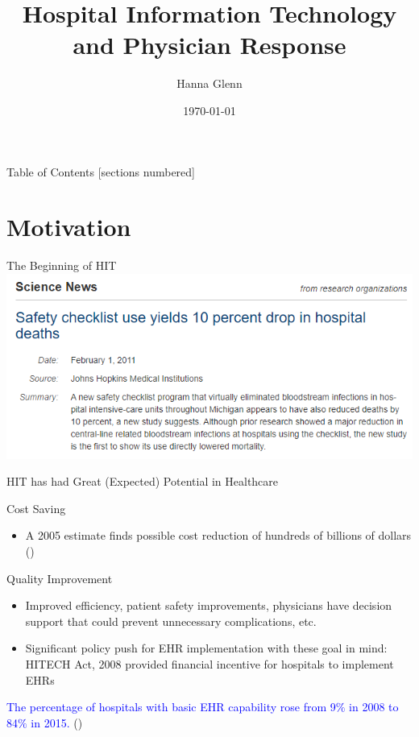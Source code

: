 \documentclass[10pt]{beamer}
\title{Hospital Information Technology and Physician Response}
\subtitle{Hanna Glenn}
\date{\today}
\begin{document}
\maketitle


\begin{frame}{Table of Contents}
  [sections numbered]
  \tableofcontents%
\end{frame}

\section[Motivation]{Motivation}

\begin{frame}{The Beginning of HIT}
\centering
    \includegraphics[scale=.6]{graphics/News Clip4.PNG}
\end{frame}

\begin{frame}[fragile]{HIT has had Great (Expected) Potential in Healthcare}
\begin{alertblock}{Cost Saving}
\begin{itemize}
    \item A 2005 estimate finds possible cost reduction of hundreds of billions of dollars (\cite{hillestad2005})
\end{itemize}
\end{alertblock}

\begin{alertblock}{Quality Improvement}
\begin{itemize}
    \item Improved efficiency, patient safety improvements, physicians have decision support that could prevent unnecessary complications, etc.
    \item Significant policy push for EHR implementation with these goal in mind: HITECH Act, 2008 provided financial incentive for hospitals to implement EHRs \nocite{hitech}
\end{itemize}
\end{alertblock}

\textcolor{blue}{The percentage of hospitals with basic EHR capability rose from 9$\%$ in 2008 to 84$\%$ in 2015.} (\cite{stats})

\end{frame}
\end{document}
